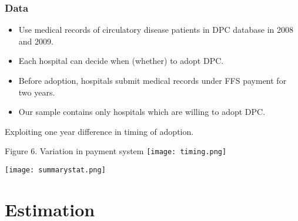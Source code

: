 \documentclass[14pt]{beamer}
\begin{document}
\begin{frame}[allowframebreaks]
\frametitle{Data}
\begin{itemize}
\item Use medical records of circulatory disease patients in DPC database in 2008 and 2009.
\item Each hospital can decide when (whether) to adopt DPC.
\item Before adoption, hospitals submit medical records under FFS payment for two years.
\item Our sample contains only hospitals which are willing to adopt DPC.

\end{itemize}

\framebreak

Exploiting one year difference in timing of adoption.

\begin{center}
{\small Figure 6. Variation in payment system}
\texttt{[image: timing.png]}
\end{center}





\framebreak

\begin{center}
\texttt{[image: summarystat.png]}
\end{center}

\end{frame}

\section{Estimation}
\end{document}

